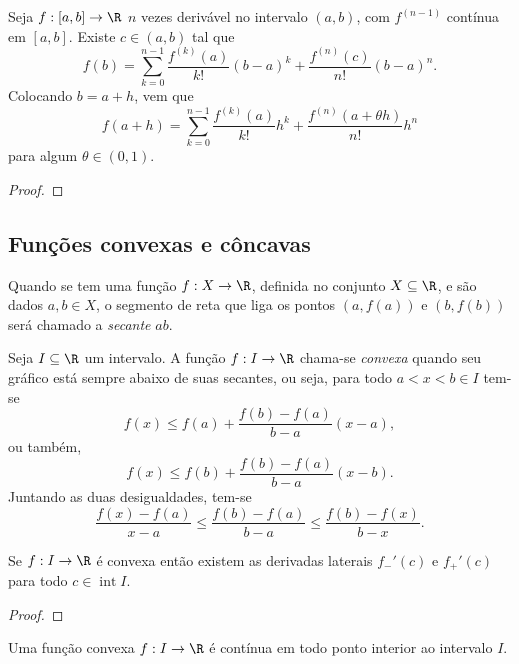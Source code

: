 \documentclass{article}
\begin{document}
\begin{thm} 
    Seja \(f: [a,b] \to \R\) \(n\) vezes derivável no intervalo \((a,b)\), com \(f^{(n-1)}\) contínua em \([a,b]\). Existe \(c \in (a,b)\) tal que \[f(b) = \sum_{k=0}^{n-1} \frac{f^{(k)}(a)}{k!} (b-a)^k + \frac{f^{(n)}(c)}{n!} (b-a)^n.\]
    Colocando \(b=a+h\), vem que \[f(a+h) = \sum_{k=0}^{n-1} \frac{f^{(k)}(a)}{k!} h^k + \frac{f^{(n)}(a+\theta h)}{n!} h^n\] para algum \(\theta \in (0,1)\).
\end{thm}

\begin{proof}
    
\end{proof}

\subsection{Funções convexas e côncavas}

\begin{defn}
    Quando se tem uma função \(f: X \to \R\), definida no conjunto \(X \subseteq \R\), e são dados \(a,b \in X\), o segmento de reta que liga os pontos \((a,f(a))\) e \((b,f(b))\) será chamado a \emph{secante} \(ab\).
\end{defn}

\begin{defn}
    Seja \(I \subseteq \R\) um intervalo. A função \(f: I \to \R\) chama-se \emph{convexa} quando seu gráfico está sempre abaixo de suas secantes, ou seja, para todo \(a<x<b \in I\) tem-se
    \[
        f(x) \leq f(a) + \frac{f(b)-f(a)}{b-a} (x-a),
    \]
    ou também,
    \[
        f(x) \leq f(b) + \frac{f(b)-f(a)}{b-a} (x-b).
    \]
    Juntando as duas desigualdades, tem-se
    \[
        \frac{f(x)-f(a)}{x-a} \leq \frac{f(b)-f(a)}{b-a} \leq \frac{f(b)-f(x)}{b-x}.
    \]
\end{defn}

\begin{prop}
    Se \(f: I \to \R\) é convexa então existem as derivadas laterais \(f_{-}'(c)\) e \(f_{+}'(c)\) para todo \(c \in \operatorname{int} I\).
\end{prop}

\begin{proof}
    
\end{proof}

\begin{cor}
    Uma função convexa \(f: I \to \R\) é contínua em todo ponto interior ao intervalo \(I\).
\end{cor}
\end{document}
